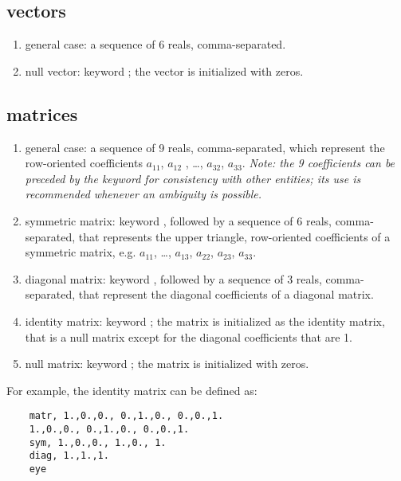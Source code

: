 \subsection{ vectors}
\begin{enumerate}
    \item general case: a sequence of 6 reals, comma-separated.
    \item null vector: keyword ; the vector is initialized 
    with zeros.	
\end{enumerate}
\subsection{ matrices}
\begin{enumerate}
    \item general case: a sequence of 9 reals, comma-separated, which
    represent the row-oriented coefficients $ a_{11} $, $ a_{12}$ ,
    \ldots, $ a_{32} $, $ a_{33} $.
    \emph{Note: the 9 coefficients can be preceded by the keyword
     for consistency with other entities; its use is recommended
    whenever an ambiguity is possible.}
    \item symmetric matrix: keyword , followed by a sequence
    of 6 reals, comma-separated, that represents the upper triangle, 
    row-oriented coefficients of a symmetric matrix, 
    e.g. $ a_{11} $, \ldots , $ a_{13} $, $ a_{22} $, $ a_{23} $, $ a_{33} $.
    \item diagonal matrix: keyword , followed by a sequence
    of 3 reals, comma-separated, that represent the diagonal coefficients 
    of a diagonal matrix.
    \item identity matrix: keyword ; the matrix is initialized
    as the identity matrix, that is a null matrix except for the diagonal 
    coefficients that are 1.
    \item null matrix: keyword ; the matrix is initialized 
    with zeros.
\end{enumerate}
For example, the identity matrix can be defined as:
\begin{verbatim}
    matr, 1.,0.,0., 0.,1.,0., 0.,0.,1.
    1.,0.,0., 0.,1.,0., 0.,0.,1.
    sym, 1.,0.,0., 1.,0., 1.
    diag, 1.,1.,1.
    eye
\end{verbatim}
